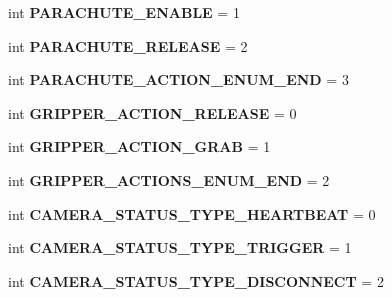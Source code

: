 \begin{DoxyCompactItemize}
int {\bfseries P\+A\+R\+A\+C\+H\+U\+T\+E\+\_\+\+E\+N\+A\+B\+LE} = 1
\item 
\mbox{\label{namespacepymavlink_1_1dialects_1_1v10_aa9f56e2fcdde407ff344caa60ed4d0d9}} 
int {\bfseries P\+A\+R\+A\+C\+H\+U\+T\+E\+\_\+\+R\+E\+L\+E\+A\+SE} = 2
\item 
\mbox{\label{namespacepymavlink_1_1dialects_1_1v10_ad393b318d7de7f86b497e83da68c3a69}} 
int {\bfseries P\+A\+R\+A\+C\+H\+U\+T\+E\+\_\+\+A\+C\+T\+I\+O\+N\+\_\+\+E\+N\+U\+M\+\_\+\+E\+ND} = 3
\item 
\mbox{\label{namespacepymavlink_1_1dialects_1_1v10_ac6ee271db488032d3ded26f373dd2a70}} 
int {\bfseries G\+R\+I\+P\+P\+E\+R\+\_\+\+A\+C\+T\+I\+O\+N\+\_\+\+R\+E\+L\+E\+A\+SE} = 0
\item 
\mbox{\label{namespacepymavlink_1_1dialects_1_1v10_a5655d4bbabf31c09d9a9668a68382501}} 
int {\bfseries G\+R\+I\+P\+P\+E\+R\+\_\+\+A\+C\+T\+I\+O\+N\+\_\+\+G\+R\+AB} = 1
\item 
\mbox{\label{namespacepymavlink_1_1dialects_1_1v10_a782cef3809d0c9910f636a09197a03a1}} 
int {\bfseries G\+R\+I\+P\+P\+E\+R\+\_\+\+A\+C\+T\+I\+O\+N\+S\+\_\+\+E\+N\+U\+M\+\_\+\+E\+ND} = 2
\item 
\mbox{\label{namespacepymavlink_1_1dialects_1_1v10_a1516b24cd2dbcfbaa7f33faefe1c20fe}} 
int {\bfseries C\+A\+M\+E\+R\+A\+\_\+\+S\+T\+A\+T\+U\+S\+\_\+\+T\+Y\+P\+E\+\_\+\+H\+E\+A\+R\+T\+B\+E\+AT} = 0
\item 
\mbox{\label{namespacepymavlink_1_1dialects_1_1v10_aa4aafcada2f1ae8655cd6e4c4e8b8d56}} 
int {\bfseries C\+A\+M\+E\+R\+A\+\_\+\+S\+T\+A\+T\+U\+S\+\_\+\+T\+Y\+P\+E\+\_\+\+T\+R\+I\+G\+G\+ER} = 1
\item 
\mbox{\label{namespacepymavlink_1_1dialects_1_1v10_a0623df5d130ce43f71ce6695a035bb9f}} 
int {\bfseries C\+A\+M\+E\+R\+A\+\_\+\+S\+T\+A\+T\+U\+S\+\_\+\+T\+Y\+P\+E\+\_\+\+D\+I\+S\+C\+O\+N\+N\+E\+CT} = 2
\item 

\end{DoxyCompactItemize}
